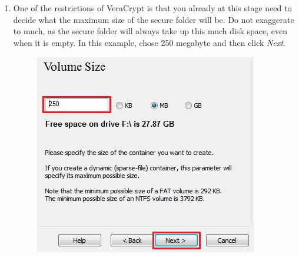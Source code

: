 \documentclass{tufte-handout}
\begin{document}
\begin{enumerate}
	\newpage
	
	\item One of the restrictions of VeraCrypt is that you already at this stage need to decide what the maximum size of the secure folder will be. Do not exaggerate to much, as the secure folder will always take up this much disk space, even when it is empty. In this example, chose 250 megabyte and then click \textit{Next}.
	\begin{figure}%
		\includegraphics[width=.7\linewidth]{img/vc_install_7.png}
	\end{figure}
	\FloatBarrier
	

\end{enumerate}
\end{document}
